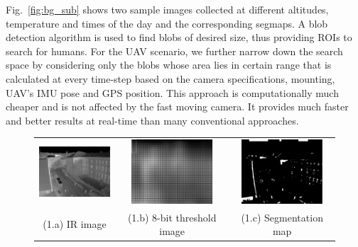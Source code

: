 \documentclass[runningheads]{llncs}
\begin{document}
Fig.~\ref{fig:bg_sub} shows two sample images collected at different altitudes, temperature and times of the day and the corresponding segmaps. A blob detection algorithm \cite{cvblob} is used to find blobs of desired size, thus providing ROIs to search for humans. For the UAV scenario, we further narrow down the search space by considering only the blobs whose area lies in certain range that is calculated at every time-step based on the camera specifications, mounting, UAV's IMU pose and GPS position. This approach is computationally much cheaper and is not affected by the fast moving camera. It provides much faster and better results at real-time than many conventional approaches.


\begin{figure}[!ht]
  \centering
  \begin{tabular}{ccc}
    \includegraphics[width=3cm]{img/eps/bg_sub/CLA_Infrared_Image_screenshot_03-08-2015.eps} &
    \includegraphics[width=3cm]{img/eps/bg_sub/CLA_Threshold_values_high_screenshot_03-08-2015.eps} &
    \includegraphics[width=3cm]{img/eps/bg_sub/CLA_Segmentation_Map_screenshot_03-08-2015.eps} \\
    \small (1.a) IR image & 
    \small (1.b) 8-bit threshold image &
    \small (1.c) Segmentation map
  \end{tabular}

  \vspace{\floatsep}


\end{figure}
\end{document}
